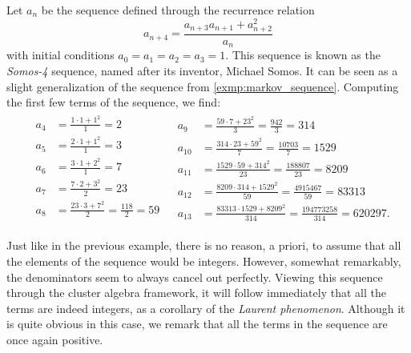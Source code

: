\begin{example}\label{exmp:somos4}

	Let $a_n$ be the sequence defined through the recurrence relation
	\begin{equation}
		\label{eq:somos_4}
		a_{n+4} = \frac{a_{n+3}a_{n+1}+ a_{n+2}^2}{a_n}
	\end{equation}
	with initial conditions $a_0 = a_1 = a_2 = a_3 = 1$. This sequence is known as the
	\emph{Somos-4} sequence, named after its inventor, Michael
	Somos. It can be seen as a slight generalization of the sequence from
	\cref{exmp:markov_sequence}. Computing the first few terms of the sequence, we find:
	\begin{align*}
		 & \begin{aligned}
			   a_4 & = \frac{1 \cdot 1 + 1^2}{1} = 2                   \\
			   a_5 & = \frac{2 \cdot 1 + 1^2}{1} = 3                   \\
			   a_6 & = \frac{3 \cdot 1 + 2^2}{1} = 7                   \\
			   a_7 & = \frac{7 \cdot 2 + 3^2}{2} = 23                  \\
			   a_8 & = \frac{23 \cdot 3 + 7^2}{2} = \frac{118}{2} = 59 \\
		   \end{aligned}
		 &
		\begin{aligned}
			a_9    & = \frac{59 \cdot 7 + 23^2}{3} = \frac{942}{3} = 314                       \\
			a_{10} & = \frac{314 \cdot 23 + 59^2}{7} = \frac{10703}{7} = 1529                  \\
			a_{11} & = \frac{1529 \cdot 59 + 314^2}{23} = \frac{188807}{23} = 8209             \\
			a_{12} & = \frac{8209 \cdot 314 + 1529^2}{59} = \frac{4915467}{59} = 83313         \\
			a_{13} & = \frac{83313 \cdot 1529 + 8209^2}{314} = \frac{194773258}{314} = 620297.
		\end{aligned}
	\end{align*}

	Just like in the previous example, there is no reason, a priori, to assume that all the
	elements of the sequence would be integers. However, somewhat remarkably, the
	denominators seem to always cancel out perfectly. Viewing this sequence through the
	cluster algebra framework, it will follow immediately that all the terms are indeed
	integers, as a corollary of the \emph{Laurent phenomenon}.
	Although it is quite obvious in this case, we remark that all the terms in the sequence
	are once again positive.
\end{example}

